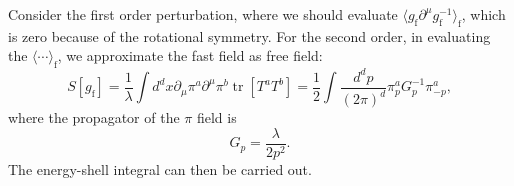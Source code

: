\documentclass[aps,prb,superscriptaddress,nofootinbib]{revtex4}
\def \tr{\operatorname{tr}}
\begin{document}
Consider the first order perturbation, where we should evaluate $\langle g_{\mathrm{f}} \partial^\mu g_{\mathrm{f}}^{-1}\rangle_{\mathrm{f}}$, which is zero because of the rotational symmetry.
For the second order, in evaluating the $\langle\cdots\rangle_\mathrm{f}$, we approximate the fast field as free field:
\begin{equation}
	S[g_{\mathrm{f}}] = \frac{1}{\lambda} \int d^d x \partial_\mu \pi^a \partial^\mu \pi^b \tr[T^a T^b]
	= \frac{1}{2}\int \frac{d^d p}{(2\pi)^d} \pi^a_pG^{-1}_p\pi^a_{-p},
\end{equation}
where the propagator of the $\pi$ field is
\begin{equation}
	G_p = \frac{\lambda}{2 p^2}.
\end{equation}
The energy-shell integral can then be carried out.
\end{document}
